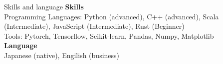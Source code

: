 \begin{rSection}{Skills and language}
{\bf Skills} \\
Programming Languages: Python (advanced), C++ (advanced), Scala (Intermediate), JavaScript (Intermediate), Rust (Beginner) \\
Tools: Pytorch, Tensorflow, Scikit-learn, Pandas, Numpy, Matplotlib \\
{\bf Language} \\
Japanese (native), Engilish (business) \\
\end{rSection}